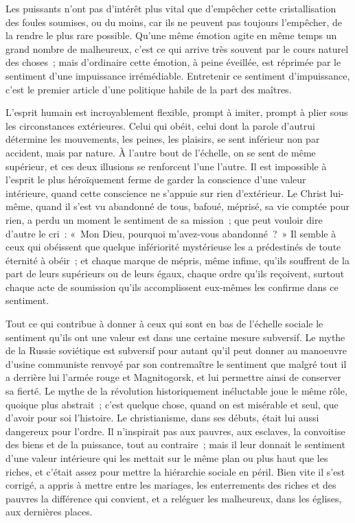 \documentclass[french,twoside]{book} %
\begin{document}
Les puissants n'ont pas d'intérêt plus vital que d'empêcher cette cristallisation des foules soumises, ou du moins, car ils ne peuvent pas toujours l'empêcher, de la rendre le plus rare possible. Qu'une même émotion agite en même temps un grand nombre de malheureux, c'est ce qui arrive très souvent par le cours naturel des choses ; mais d'ordinaire cette émotion, à peine éveillée, est réprimée par le sentiment d'une impuissance irrémédiable. Entretenir ce sentiment d'impuissance, c'est le premier article d'une politique habile de la part des maîtres.\par
L'esprit humain est incroyablement flexible, prompt à imiter, prompt à plier sous les circonstances extérieures. Celui qui obéit, celui dont la parole d'autrui détermine les mouvements, les peines, les plaisirs, se sent inférieur non par accident, mais par nature. À l’autre bout de l'échelle, on se sent de même supérieur, et ces deux illusions se renforcent l'une l'autre. Il est impossible à l'esprit le plus héroïquement ferme de garder la conscience d'une valeur intérieure, quand cette conscience ne s'appuie sur rien d'extérieur. Le Christ lui-même, quand il s'est vu abandonné de tous, bafoué, méprisé, sa vie comptée pour rien, a perdu un moment le sentiment de sa mission ; que peut vouloir dire d'autre le cri : « Mon Dieu, pourquoi m'avez-vous abandonné ? » Il semble à ceux qui obéissent que quelque infériorité mystérieuse les a prédestinés de toute éternité à obéir ; et chaque marque de mépris, même infime, qu'ils souffrent de la part de leurs supérieurs ou de leurs égaux, chaque ordre qu'ils reçoivent, surtout chaque acte de soumission qu'ils accomplissent eux-mêmes les confirme dans ce sentiment.\par
Tout ce qui contribue à donner à ceux qui sont en bas de l'échelle sociale le sentiment qu'ils ont une valeur est dans une certaine mesure subversif. Le mythe de la Russie soviétique est subversif pour autant qu'il peut donner au manoeuvre d'usine communiste renvoyé par son contremaître le sentiment que malgré tout il a derrière lui l'armée rouge et Magnitogorsk, et lui permettre ainsi de conserver sa fierté. Le mythe de la révolution historiquement inéluctable joue le même rôle, quoique plus abstrait ; c'est quelque chose, quand on est misérable et seul, que d'avoir pour soi l'histoire. Le christianisme, dans ses débuts, était lui aussi dangereux pour l'ordre. Il n'inspirait pas aux pauvres, aux esclaves, la convoitise des biens et de la puissance, tout au contraire ; mais il leur donnait le sentiment d'une valeur intérieure qui les mettait sur le même plan ou plus haut que les riches, et c'était assez pour mettre la hiérarchie sociale en péril. Bien vite il s'est corrigé, a appris à mettre entre les mariages, les enterrements des riches et des pauvres la différence qui convient, et a reléguer les malheureux, dans les églises, aux dernières places.\par
\end{document}
